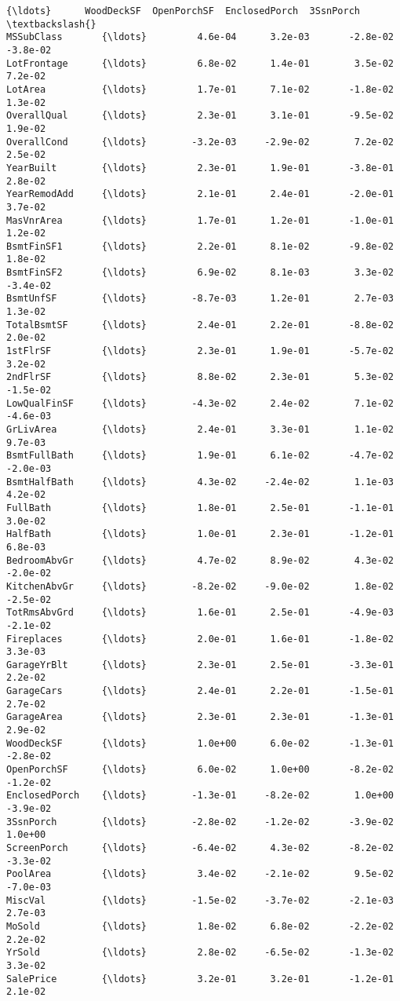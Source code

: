 \documentclass[11pt]{article}
\begin{document}
\begin{Verbatim}[commandchars=\\\{\}]
                 {\ldots}      WoodDeckSF  OpenPorchSF  EnclosedPorch  3SsnPorch  \textbackslash{}
MSSubClass       {\ldots}         4.6e-04      3.2e-03       -2.8e-02   -3.8e-02   
LotFrontage      {\ldots}         6.8e-02      1.4e-01        3.5e-02    7.2e-02   
LotArea          {\ldots}         1.7e-01      7.1e-02       -1.8e-02    1.3e-02   
OverallQual      {\ldots}         2.3e-01      3.1e-01       -9.5e-02    1.9e-02   
OverallCond      {\ldots}        -3.2e-03     -2.9e-02        7.2e-02    2.5e-02   
YearBuilt        {\ldots}         2.3e-01      1.9e-01       -3.8e-01    2.8e-02   
YearRemodAdd     {\ldots}         2.1e-01      2.4e-01       -2.0e-01    3.7e-02   
MasVnrArea       {\ldots}         1.7e-01      1.2e-01       -1.0e-01    1.2e-02   
BsmtFinSF1       {\ldots}         2.2e-01      8.1e-02       -9.8e-02    1.8e-02   
BsmtFinSF2       {\ldots}         6.9e-02      8.1e-03        3.3e-02   -3.4e-02   
BsmtUnfSF        {\ldots}        -8.7e-03      1.2e-01        2.7e-03    1.3e-02   
TotalBsmtSF      {\ldots}         2.4e-01      2.2e-01       -8.8e-02    2.0e-02   
1stFlrSF         {\ldots}         2.3e-01      1.9e-01       -5.7e-02    3.2e-02   
2ndFlrSF         {\ldots}         8.8e-02      2.3e-01        5.3e-02   -1.5e-02   
LowQualFinSF     {\ldots}        -4.3e-02      2.4e-02        7.1e-02   -4.6e-03   
GrLivArea        {\ldots}         2.4e-01      3.3e-01        1.1e-02    9.7e-03   
BsmtFullBath     {\ldots}         1.9e-01      6.1e-02       -4.7e-02   -2.0e-03   
BsmtHalfBath     {\ldots}         4.3e-02     -2.4e-02        1.1e-03    4.2e-02   
FullBath         {\ldots}         1.8e-01      2.5e-01       -1.1e-01    3.0e-02   
HalfBath         {\ldots}         1.0e-01      2.3e-01       -1.2e-01    6.8e-03   
BedroomAbvGr     {\ldots}         4.7e-02      8.9e-02        4.3e-02   -2.0e-02   
KitchenAbvGr     {\ldots}        -8.2e-02     -9.0e-02        1.8e-02   -2.5e-02   
TotRmsAbvGrd     {\ldots}         1.6e-01      2.5e-01       -4.9e-03   -2.1e-02   
Fireplaces       {\ldots}         2.0e-01      1.6e-01       -1.8e-02    3.3e-03   
GarageYrBlt      {\ldots}         2.3e-01      2.5e-01       -3.3e-01    2.2e-02   
GarageCars       {\ldots}         2.4e-01      2.2e-01       -1.5e-01    2.7e-02   
GarageArea       {\ldots}         2.3e-01      2.3e-01       -1.3e-01    2.9e-02   
WoodDeckSF       {\ldots}         1.0e+00      6.0e-02       -1.3e-01   -2.8e-02   
OpenPorchSF      {\ldots}         6.0e-02      1.0e+00       -8.2e-02   -1.2e-02   
EnclosedPorch    {\ldots}        -1.3e-01     -8.2e-02        1.0e+00   -3.9e-02   
3SsnPorch        {\ldots}        -2.8e-02     -1.2e-02       -3.9e-02    1.0e+00   
ScreenPorch      {\ldots}        -6.4e-02      4.3e-02       -8.2e-02   -3.3e-02   
PoolArea         {\ldots}         3.4e-02     -2.1e-02        9.5e-02   -7.0e-03   
MiscVal          {\ldots}        -1.5e-02     -3.7e-02       -2.1e-03    2.7e-03   
MoSold           {\ldots}         1.8e-02      6.8e-02       -2.2e-02    2.2e-02   
YrSold           {\ldots}         2.8e-02     -6.5e-02       -1.3e-02    3.3e-02   
SalePrice        {\ldots}         3.2e-01      3.2e-01       -1.2e-01    2.1e-02   


\end{Verbatim}
\end{document}
